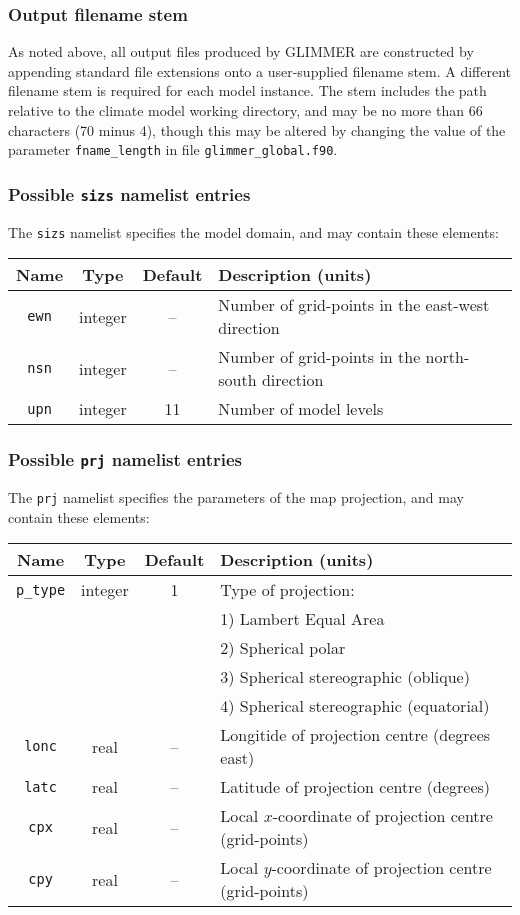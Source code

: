 \subsubsection{Output filename stem}
%
As noted above, all output files produced by GLIMMER are constructed by
appending standard file extensions onto a user-supplied filename
stem. A different filename stem is required for each model instance. The stem
includes the path relative to the climate model working directory, and may be
no more than 66 characters (70 minus 4), though this may be altered
by changing the value of the parameter \texttt{fname\_length} in file
\texttt{glimmer\_global.f90}.
%
\subsubsection{Possible \texttt{sizs} namelist entries}
%
The \texttt{sizs} namelist specifies the model domain,
and may contain these elements:
%
\begin{center}
\begin{tabular}{|c|c|c|l|}
\hline
Name & Type & Default & Description (units) \\
\hline
\hline
\texttt{ewn} & integer & -- & Number of grid-points in the east-west
direction \\
\texttt{nsn} & integer & -- & Number of grid-points in the north-south
direction \\
\texttt{upn} & integer & 11 & Number of model levels \\
\hline
\end{tabular}
\end{center}
%
\subsubsection{Possible \texttt{prj} namelist entries}
%
The \texttt{prj} namelist specifies the parameters of the map projection, and
may contain these elements:
%
\begin{center}
\begin{tabular}{|c|c|c|l|}
\hline
Name & Type & Default & Description (units) \\
\hline
\hline
\texttt{p\_type} & integer & 1 & Type of projection: \\
 & & & 1) Lambert Equal Area \\
 & & & 2) Spherical polar \\
 & & & 3) Spherical stereographic (oblique) \\
 & & & 4) Spherical stereographic (equatorial) \\
\hline  
\texttt{lonc} & real & -- & Longitide of projection centre (degrees east) \\
\texttt{latc} & real & -- & Latitude of projection centre (degrees)\\
\texttt{cpx} & real & -- & Local $x$-coordinate of projection centre
(grid-points) \\
\texttt{cpy} & real & -- & Local $y$-coordinate of projection centre
(grid-points) \\
\hline
\end{tabular}
\end{center}
%
